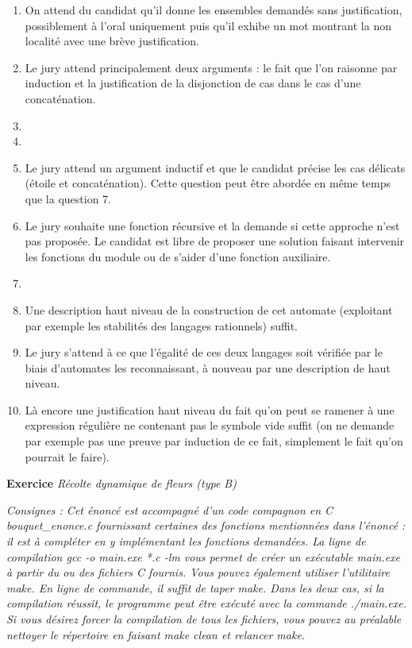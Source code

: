 \documentclass[a4paper, 11pt]{article}
\newcounter{exocntr}
\newcommand{\exocommand}[1]{\stepcounter{exocntr} \textbf{Exercice \arabic{exocntr}} \textit{#1}}
\begin{document}
\begin{enumerate}
\item On attend du candidat qu'il donne les ensembles demandés sans justification, possiblement à l'oral uniquement puis qu'il exhibe un mot montrant la non localité avec une brève justification.
\item Le jury attend principalement deux arguments : le fait que l'on raisonne par induction et la justification de la disjonction de cas dans le cas d'une concaténation.
\item
\item
\item Le jury attend un argument inductif et que le candidat précise les cas délicats (étoile et concaténation). Cette question peut être abordée en même temps que la question 7.
\item Le jury souhaite une fonction récursive et la demande si cette approche n'est pas proposée. Le candidat est libre de proposer une solution faisant intervenir les fonctions du module  ou de s'aider d'une fonction auxiliaire.
\item
\item Une description haut niveau de la construction de cet automate (exploitant par exemple les stabilités des langages rationnels) suffit.
\item Le jury s'attend à ce que l'égalité de ces deux langages soit vérifiée par le biais d'automates les reconnaissant, à nouveau par une description de haut niveau.
\item Là encore une justification haut niveau du fait qu'on peut se ramener à une expression régulière ne contenant pas le symbole vide suffit (on ne demande par exemple pas une preuve par induction de ce fait, simplement le fait qu'on pourrait le faire).
\end{enumerate}

\newpage


\exocommand{Récolte dynamique de fleurs (type B)}

\textit{Consignes : Cet énoncé est accompagné d’un code compagnon en C \textsf{bouquet\_enonce.c} fournissant certaines des fonctions mentionnées dans l’énoncé : il est à compléter en y implémentant les fonctions demandées. La ligne de compilation \textsf{gcc -o main.exe *.c -lm} vous permet de créer un exécutable \textsf{main.exe} à partir du ou des fichiers C fournis. Vous pouvez également utiliser l’utilitaire \textsf{make}. En ligne de commande, il suffit de taper \textsf{make}. Dans les deux cas, si la compilation réussit, le programme peut être exécuté avec la commande \textsf{./main.exe}. Si vous désirez forcer la compilation de tous les fichiers, vous pouvez au préalable nettoyer le répertoire en faisant \textsf{make clean} et relancer \textsf{make}.}
\end{document}
